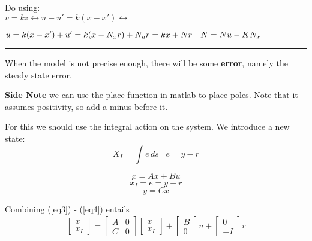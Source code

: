 \documentclass[a4paper]{article}
\begin{document}
Do using:\\
$  v = kz \leftrightarrow u-u' = k(x-x') \leftrightarrow $
\begin{framed}
$  u = k(x-x') + u'\\ = k(x- N_x r) + N_u r \\ = kx + Nr \hspace{10pt} N = Nu - K N_x $
\end{framed}

\vspace{5pt}
\hrule
\vspace{5pt}
When the model is not precise enough, there will be some \textbf{error}, namely the steady state error.

\vspace{5pt}

\textbf{Side Note} we can use the place function in matlab to place poles. Note that it assumes positivity, so add a minus before it. 

For this we should use the integral action on the system. We introduce a new state:
\begin{equation}
	X_I = \int e \hspace{2pt} ds \hspace{10pt} e = y - r
\end{equation}

\begin{equation} \label{eq3}
\dot{x} = Ax + Bu
\end{equation}
\begin{equation}
	\dot{x_I} = e = y-r
\end{equation}
\begin{equation} \label{eq4}
y = Cx
\end{equation}

Combining (\ref{eq3}) - (\ref{eq4}) entails 
\begin{equation}
	\dot{\begin{bmatrix}
x \\
x_I
\end{bmatrix}} = \begin{bmatrix}
A & 0 \\
C & 0
\end{bmatrix} \begin{bmatrix}
x \\
x_I
\end{bmatrix} + \begin{bmatrix}
B \\
0
\end{bmatrix} u + \begin{bmatrix}
0 \\
-I
\end{bmatrix} r
\end{equation}
\end{document}
